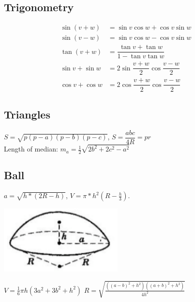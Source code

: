 \subsection{Trigonometry}
\begin{align*}
\sin(v+w)&{}=\sin v\cos w+\cos v\sin w\\
\sin(v-w)&{}=\sin v\cos w-\cos v\sin w\\
\tan(v+w)&{}=\dfrac{\tan v+\tan w}{1-\tan v\tan w}\\
\sin v+\sin w&{}=2\sin\dfrac{v+w}{2}\cos\dfrac{v-w}{2}\\
\cos v+\cos w&{}=2\cos\dfrac{v+w}{2}\cos\dfrac{v-w}{2}
\end{align*}

\subsection{Triangles}
$S=\sqrt{p(p-a)(p-b)(p-c)}$, 
$S=\dfrac{abc}{4R} = pr$\\

Length of median: $m_a=\tfrac{1}{2}\sqrt{2b^2+2c^2-a^2}$\\

\subsection{Ball}
$a = \sqrt{h * (2R - h)}$, 
$V = \pi * h^2(R -\frac{h}{3})$.

\begin{center}\begin{minipage}{50mm}
\includegraphics[width=\textwidth]{content/various/ball-segment.png}
\end{minipage}\end{center}

$V = \frac{1}{6}\pi h(3a^2+3b^2+h^2)$
$R = \sqrt{\frac{((a - b)^2 + h^2)((a + b)^2 + h^2)}{4h^2}}$

